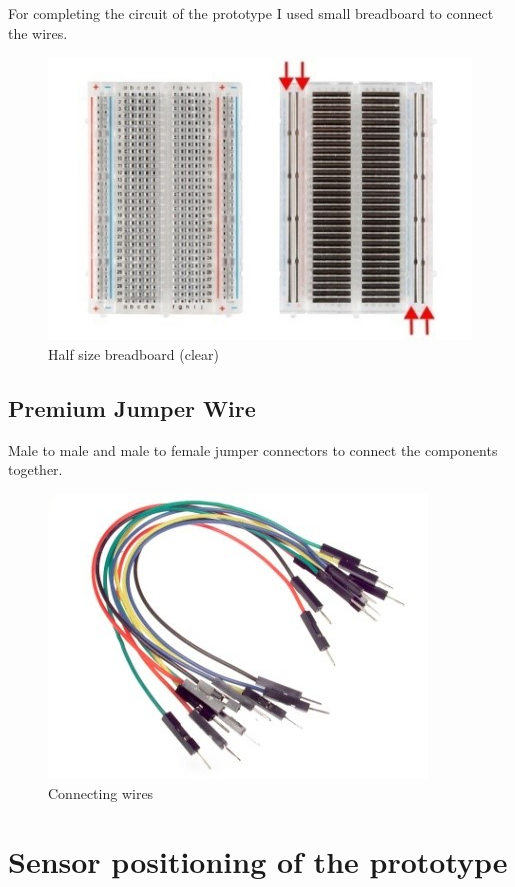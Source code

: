 \documentclass[14pt,a4paper]{extarticle}
\begin{document}
	For completing the circuit of the prototype I used small breadboard to connect the wires. 
	
	\begin{figure}[H]
		\includegraphics[center]{breadboard.jpg}
		\caption{Half size breadboard (clear)}
	\end{figure}
	
	\subsection{Premium Jumper Wire}
	
	Male to male and male to female jumper connectors to connect the components together.
	
	\begin{figure}[H]
		\includegraphics[center]{jumper.jpg}
		\caption{Connecting wires}
	\end{figure}


	\section{Sensor positioning of the prototype}
	
\end{document}
